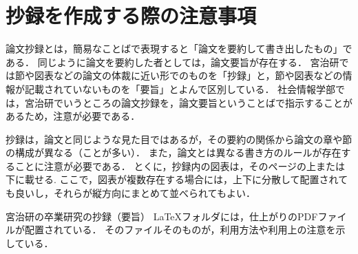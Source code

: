 \documentclass[a4paper,10pt,twocolumn]{jsarticle}
\begin{document}
\section{抄録を作成する際の注意事項}
論文抄録とは，簡易なことばで表現すると「論文を要約して書き出したもの」である．
同じように論文を要約した者としては，論文要旨が存在する．
宮治研では節や図表などの論文の体裁に近い形でのものを「抄録」と，節や図表などの情報が記載されていないものを「要旨」とよんで区別している．
社会情報学部では，宮治研でいうところの論文抄録を，論文要旨ということばで指示することがあるため，注意が必要である．

抄録は，論文と同じような見た目ではあるが，その要約の関係から論文の章や節の構成が異なる（ことが多い）．
また，論文とは異なる書き方のルールが存在することに注意が必要である．
とくに，抄録内の図表は，そのページの上または下に載せる.
ここで，図表が複数存在する場合には，上下に分散して配置されても良いし，それらが縦方向にまとめて並べられてもよい．

宮治研の卒業研究の抄録（要旨） \LaTeX フォルダには，仕上がりのPDFファイルが配置されている．
そのファイルそのものが，利用方法や利用上の注意を示している．

%
\end{document}
